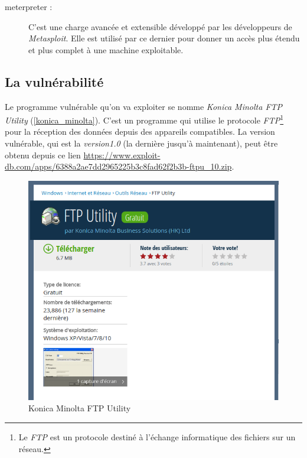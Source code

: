 \begin{description}
        \item[meterpreter :] \label{meterpreter}C'est une charge avancée et extensible développé par les développeurs de 
            \emph{Metasploit}. Elle est utilisé par ce dernier pour donner un accès plus étendu et plus 
            complet à une machine exploitable. 
    \end{description}

    \subsection{La vulnérabilité}
    Le programme vulnérable qu'on va exploiter se nomme \emph{Konica Minolta FTP Utility} (\autoref{konica_minolta}). 
    C'est un programme qui utilise le protocole \emph{FTP}\footnote{Le \emph{FTP} est un protocole destiné
    à l'échange informatique des fichiers sur un réseau.} pour la réception des données depuis des appareils 
    compatibles. La version vulnérable, qui est la \emph{version1.0} 
    (la dernière jusqu'à maintenant), peut être obtenu depuis ce lien 
    \url{https://www.exploit-db.com/apps/6388a2ae7dd2965225b3c8fad62f2b3b-ftpu_10.zip}.

    \begin{figure}[h]
        \centering
        \includegraphics[width=0.8\linewidth]{images/konica_minolta.png}
        \caption{Konica Minolta FTP Utility}
        \label{konica_minolta}
    \end{figure}

